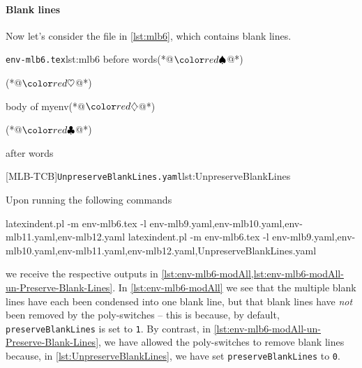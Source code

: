 
	\paragraph{Blank lines}
	Now let's consider the file in \cref{lst:mlb6}, which contains blank lines.

	\begin{minipage}{.45\linewidth}
		\begin{cmhlistings}[escapeinside={(*@}{@*)}]{\texttt{env-mlb6.tex}}{lst:mlb6}
before words(*@$\BeginStartsOnOwnLine$@*)


\begin{myenv}(*@$\BodyStartsOnOwnLine$@*)


body of myenv(*@$\EndStartsOnOwnLine$@*)


\end{myenv}(*@$\EndFinishesWithLineBreak$@*)

after words
\end{cmhlistings}
	\end{minipage}%
	\hfill
	\begin{minipage}{.45\linewidth}
		[MLB-TCB]{\texttt{UnpreserveBlankLines.yaml}}{lst:UnpreserveBlankLines}
	\end{minipage}

	Upon running the following commands
	\begin{sidebyside}
		\begin{commandshell}
latexindent.pl -m env-mlb6.tex -l env-mlb9.yaml,env-mlb10.yaml,env-mlb11.yaml,env-mlb12.yaml
latexindent.pl -m env-mlb6.tex -l env-mlb9.yaml,env-mlb10.yaml,env-mlb11.yaml,env-mlb12.yaml,UnpreserveBlankLines.yaml
\end{commandshell}
	\end{sidebyside}
	we receive the respective outputs in \cref{lst:env-mlb6-modAll,lst:env-mlb6-modAll-un-Preserve-Blank-Lines}. In
	\cref{lst:env-mlb6-modAll} we see that the multiple blank lines have each been condensed into one blank line,
	but that blank lines have \emph{not} been removed by the poly-switches -- this is because, by default, \texttt{preserveBlankLines}
	is set to \texttt{1}. By contrast, in \cref{lst:env-mlb6-modAll-un-Preserve-Blank-Lines}, we have allowed
	the poly-switches to remove blank lines because, in \cref{lst:UnpreserveBlankLines}, we have set \texttt{preserveBlankLines} to \texttt{0}.

